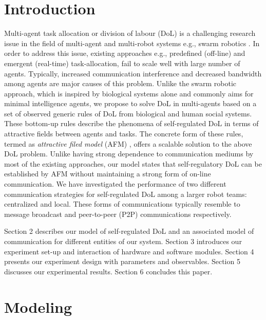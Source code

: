 \documentclass{llncs}
\begin{document}
\section{Introduction}
\label{sec:intro}
Multi-agent task allocation or division of labour (DoL) is a challenging research issue in the field of multi-agent and multi-robot systems e.g., swarm robotics \cite{Swarm}. In order to address this issue, existing approaches e.g., predefined (off-line) and emergent (real-time) task-allocation, fail to scale well with large number of agents. Typically, increased communication interference and decreased bandwidth among agents are major causes of this problem. Unlike the swarm robotic approach, which is inspired by biological systems alone and commonly aims for minimal intelligence agents, we propose to solve DoL in multi-agents based on a set of observed generic rules of DoL from biological and human social systems. These bottom-up rules describe the phenomena of self-regulated DoL in terms of attractive fields between agents and tasks. The concrete form of these rules, termed as \textit{attractive filed model} (AFM) \cite{Elsa}, offers a scalable solution to the above DoL problem. Unlike having strong dependence to communication mediums by most of the existing approaches, our model states that self-regulatory DoL can be established by AFM without maintaining a strong form of on-line communication.
We have investigated the performance of two different communication strategies for self-regulated DoL among a larger robot teams: centralized and local. These forms of communications typically resemble to message broadcast and peer-to-peer (P2P) communications respectively.

Section 2 describes our model of self-regulated DoL and an associated model of communication for different entities of our system. Section 3 introduces our experiment set-up and interaction of hardware and software modules. Section 4 presents our experiment design with parameters and observables. Section 5 discusses our experimental results.  Section 6 concludes this paper. 
%
\section{Modeling}
\label{sec:model}
\end{document}
